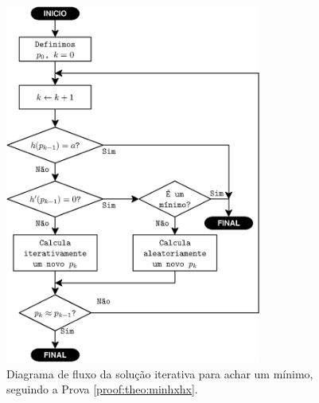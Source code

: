 \begin{figure}[!h]
     \centering
         \includegraphics[width=0.75\textwidth]{chapters/minimization-hx/fluxo1.eps}
        \caption{Diagrama de fluxo da solução iterativa para achar um mínimo, seguindo a Prova \ref{proof:theo:minhxhx}.}
        \label{fig:fluxohx1}
\end{figure}


